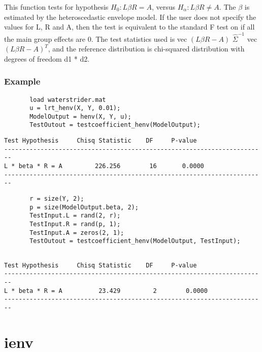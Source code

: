 \documentclass[a4paper,11pt,openany]{memoir}
\begin{document}
\begin{par}
This function tests for hypothesis $H_0: L\beta R = A$, versus $H_\alpha: L\beta R\neq A$.  The $\beta$ is estimated by the heteroscedastic envelope model.  If the user does not specify the values for L, R and A, then the test is equivalent to the standard F test on if all the main group effects are 0.  The test statistics used is vec $(L\beta R - A)$ $\hat{\Sigma}^{-1}$ vec $(L\beta R - A)^{T}$, and the reference distribution is chi-squared distribution with degrees of freedom d1 * d2.
\end{par} \vspace{1em}


\subsection*{Example}


\begin{verbatim}       load waterstrider.mat
       u = lrt_henv(X, Y, 0.01);
       ModelOutput = henv(X, Y, u);
       TestOutout = testcoefficient_henv(ModelOutput);\end{verbatim}

               \color{lightgray}\ttfamily \begin{verbatim}
Test Hypothesis     Chisq Statistic    DF     P-value
------------------------------------------------------------------------
L * beta * R = A         226.256        16       0.0000
------------------------------------------------------------------------
\end{verbatim} \rmfamily
\color{black}
\begin{verbatim}       r = size(Y, 2);
       p = size(ModelOutput.beta, 2);
       TestInput.L = rand(2, r);
       TestInput.R = rand(p, 1);
       TestInput.A = zeros(2, 1);
       TestOutout = testcoefficient_henv(ModelOutput, TestInput);\end{verbatim}
    

        \color{lightgray}\ttfamily \begin{verbatim}

Test Hypothesis     Chisq Statistic    DF     P-value
------------------------------------------------------------------------
L * beta * R = A          23.429         2        0.0000
------------------------------------------------------------------------
\end{verbatim} \rmfamily
\color{black}
    
\newpage

\chapter{ienv}
\end{document}
